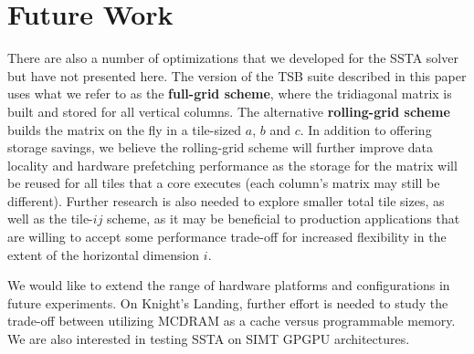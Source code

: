 \documentclass[10pt, conference, compsocconf]{IEEEtran}
\begin{document}
\section{Future Work}
\label{sec:future}

There are also a number of optimizations that we developed for the SSTA
  solver but have not presented here. 
The version of the TSB suite described in this paper uses what we refer to as
  the \textbf{full-grid scheme}, where the tridiagonal matrix is built and
  stored for all vertical columns.
The alternative \textbf{rolling-grid scheme} builds the matrix on the fly in
  a tile-sized \(a\), \(b\) and \(c\).
In addition to offering storage savings, we believe the rolling-grid scheme
  will further improve data locality and hardware prefetching performance as the
  storage for the matrix will be reused for all tiles that a core executes
  (each column's matrix may still be different).
Further research is also needed to explore smaller total tile sizes, as well as
  the tile-\(ij\) scheme, as it may be beneficial to production applications that
  are willing to accept some performance trade-off for increased flexibility in
  the extent of the horizontal dimension \(i\).



We would like to extend the range of hardware platforms and configurations in
  future experiments.
On Knight's Landing, further effort is needed to study the trade-off between
  utilizing MCDRAM as a cache versus programmable memory.
We are also interested in testing SSTA on SIMT GPGPU architectures.
\end{document}
